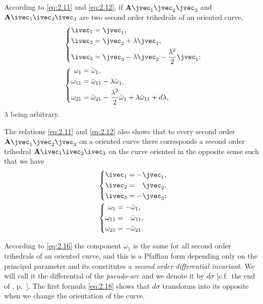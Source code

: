 According to \eqref{eq:2.11} and \eqref{eq:2.12}, if $\mathbf{A}\jvec_{1}\jvec_{2}\jvec_{3}$ and $\mathbf{A}\ivec_{1}\ivec_{2}\ivec_{3}$ are two second order trihedrals of an oriented curve,
\begin{align}
  \label{eq:2.15}
  &\left\{
    \begin{aligned}
      \ivec_{1}&=\jvec_{1},\\
      \ivec_{2}&=\jvec_{2}+\lambda\jvec_{1},\\
      \ivec_{3}&=\jvec_{3}-\lambda\jvec_{2}-\frac{\lambda^{2}}{2}\jvec_{1};
    \end{aligned}
  \right.
\\
  \label{eq:2.16}
  &\left\{
    \begin{aligned}
      \omega_{1}&=\bar\omega_{1},\\
      \omega_{11}&=\bar\omega_{11}-\lambda\bar\omega_{1},\\
      \omega_{21}&=\bar\omega_{21}-\frac{\lambda^{2}}{2}\bar\omega_{1}+\lambda\bar\omega_{11}+d\lambda,
    \end{aligned}
  \right.
\end{align}
$\lambda$ being arbitrary.

The relations \eqref{eq:2.11} and \eqref{eq:2.12} also shows that to every second order $\mathbf{A}\jvec_{1}\jvec_{2}\jvec_{3}$ on a oriented curve there corresponds a second order trihedral $\mathbf{A}\ivec_{1}\ivec_{2}\ivec_{3}$ on the curve oriented in the opposite sense such that we have
\begin{align}
  \label{eq:2.17}
  &\left\{
    \begin{aligned}
      \ivec_{1}&=-\jvec_{1},\\
      \ivec_{2}&=\hphantom{+}\jvec_{2},\\
      \ivec_{3}&=-\jvec_{3};
    \end{aligned}
  \right.
  \\
  \label{eq:2.18}
  &\left\{
    \begin{aligned}
      \omega_{1}&=-\bar\omega_{1},\\
      \omega_{11}&=\hphantom{+}\bar\omega_{11},\\
      \omega_{21}&=-\bar\omega_{21}.
    \end{aligned}
  \right.
\end{align}

According to \eqref{eq:2.16} the component $\omega_{1}$ is the same for all second order trihedrals of an oriented curve, and this is a Pfaffian form depending only on the principal parameter and its constitutes a \emph{second order differential invariant}. We will call it the differential of the \emph{pseudo-arc} and we denote it by $d\sigma$ [c.f.~the end of , p.~\pageref{sec:18}]. The first formula \eqref{eq:2.18} shows that $d\sigma$ transforms into its opposite when we change the orientation of the curve.

